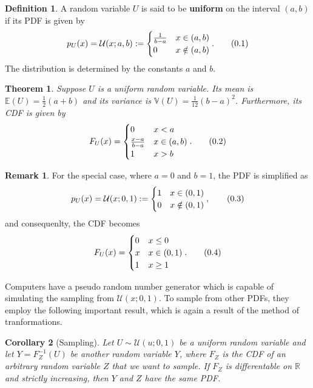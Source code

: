 \documentclass[10pt]{article}
\newtheorem{thm}{Theorem}[section]
\newtheorem{cor}[thm]{Corollary}
\theoremstyle{definition}
\newtheorem{defn}{Definition}[section]
\newtheorem*{rem}{Remark}
\newcommand\eqnum{\addtocounter{equation}{1}\tag{\arabic{section}.\arabic{equation}}}
\begin{document}
\begin{defn}
A random variable $U$ is said to be \textbf{uniform} on the interval $(a, b)$ if its PDF is given by
\begin{equation*}
p_U(x) = \mathcal{U}(x; a, b) :=
\begin{cases} 
\frac{1}{b-a} & x \in (a, b) \\
0 & x \notin (a, b)
\end{cases}.
\eqnum
\end{equation*}
The distribution is determined by the constants $a$ and $b$. 
\end{defn}
\begin{thm}
Suppose $U$ is a uniform random variable. Its mean is $\mathbb{E}(U) = \frac{1}{2}(a+b)$ and its variance is $\mathbb{V}(U)=\frac{1}{12}(b-a)^2$. Furthermore, its CDF is given by
\begin{equation*}
F_U(x) = 
\begin{cases} 
0 & x < a \\
\frac{x-a}{b-a} & x \in (a, b) \\
1 & x > b
\end{cases}.
\eqnum
\end{equation*}
\end{thm}
\begin{rem}
For the special case, where $a=0$ and $b=1$, the PDF is simplified as
\begin{equation*}
p_U(x) = \mathcal{U}(x; 0, 1) :=
\begin{cases} 
1 & x \in (0, 1) \\
0 & x \notin (0, 1)
\end{cases},
\eqnum
\end{equation*}
and consequenlty, the CDF becomes
\begin{equation*}
F_U(x) = 
\begin{cases} 
0 & x \leq 0 \\
x & x \in (0, 1) \\
1 & x \ge 1
\end{cases}.
\eqnum
\end{equation*}
\end{rem}
 Computers have a pseudo random number generator which is capable of simulating the sampling from $\mathcal{U}(x; 0, 1)$. To sample from other PDFs, they employ the following important result, which is again a result of the method of tranformations.
\begin{cor}[Sampling]\label{thm:sample}
Let $U\sim\mathcal{U}(u; 0, 1)$ be a uniform random variable  and let $Y=F_Z^{-1}(U)$ be another random variable $Y$, where $F_Z$ is the CDF of an arbitrary random variable $Z$ that we want to sample. If $F_Z$ is differentable on $\mathbb{R}$ and strictly increasing, then $Y$ and $Z$ have the same PDF.
\end{cor}
\end{document}
